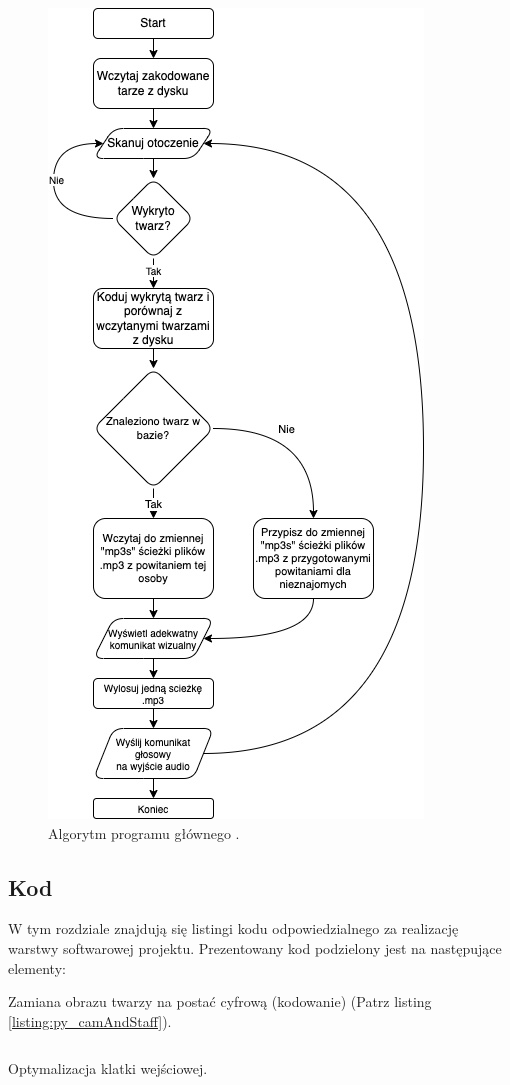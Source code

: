 \documentclass[a4paper,12pt,reqno]{article}
\begin{document}
\begin{figure}[H]%
\centering
\includegraphics[width=0.7\columnwidth]{imgs/glowny.drawio.jpg}
\caption{Algorytm programu głównego \cite{img_me}. \label{algorytm_start_recognition}}
\quad
\end{figure}

\subsection{Kod}
W tym rozdziale znajdują się listingi kodu odpowiedzialnego za realizację warstwy softwarowej projektu.
Prezentowany kod podzielony jest na następujące elementy:\newline

Zamiana obrazu twarzy na postać cyfrową (kodowanie) (Patrz listing \ref{listing:py_camAndStaff}).
\begin{listing}[H]%
\begin{mdframed}[backgroundcolor=codebg]
\inputminted{python}{code/start_cam.py}
\end{mdframed}
\caption{Optymalizacja klatki wejściowej.}
\label{listing:py_camAndStaff}
\end{listing}
\end{document}
